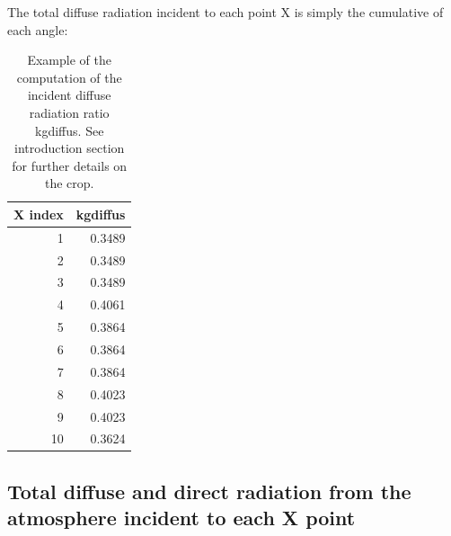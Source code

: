 \documentclass[]{book}
\newenvironment{Shaded}{\begin{snugshade}}{\end{snugshade}}
\newcommand{\KeywordTok}[1]{\textcolor[rgb]{0.13,0.29,0.53}{\textbf{#1}}}
\newcommand{\DataTypeTok}[1]{\textcolor[rgb]{0.13,0.29,0.53}{#1}}
\newcommand{\StringTok}[1]{\textcolor[rgb]{0.31,0.60,0.02}{#1}}
\newcommand{\OperatorTok}[1]{\textcolor[rgb]{0.81,0.36,0.00}{\textbf{#1}}}
\newcommand{\NormalTok}[1]{#1}
\theoremstyle{definition}
\theoremstyle{definition}
\theoremstyle{definition}
\theoremstyle{remark}
\begin{document}
The total diffuse radiation incident to each point X is simply the
cumulative of each angle:

\begin{Shaded}
\end{Shaded}

\begin{table}

\caption{\label{tab:kdifftot}Example of the computation of the incident diffuse radiation ratio kgdiffus. See introduction section for further details on the crop.}
\centering
\begin{tabular}[t]{r|r}
\hline
X index & kgdiffus\\
\hline
1 & 0.3489\\
\hline
2 & 0.3489\\
\hline
3 & 0.3489\\
\hline
4 & 0.4061\\
\hline
5 & 0.3864\\
\hline
6 & 0.3864\\
\hline
7 & 0.3864\\
\hline
8 & 0.4023\\
\hline
9 & 0.4023\\
\hline
10 & 0.3624\\
\hline
\end{tabular}
\end{table}

\subsection{Total diffuse and direct radiation from the atmosphere
incident to each X
point}\label{total-diffuse-and-direct-radiation-from-the-atmosphere-incident-to-each-x-point}
\end{document}
